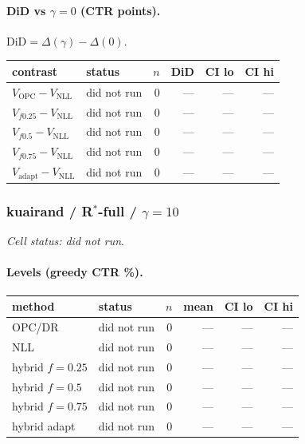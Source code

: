 \documentclass[10pt,a4paper]{article}
\begin{document}
\paragraph{DiD vs $\gamma=0$ (CTR points).} $\mathrm{DiD}=\Delta(\gamma)-\Delta(0)$.
{\centering\small\begin{tabular}{llrrrr}
\toprule contrast & status & $n$ & DiD & CI lo & CI hi \\
\midrule
$V_{\mathrm{OPC}}-V_{\mathrm{NLL}}$ & did not run & 0 & --- & --- & --- \\
$V_{f0.25}-V_{\mathrm{NLL}}$ & did not run & 0 & --- & --- & --- \\
$V_{f0.5}-V_{\mathrm{NLL}}$ & did not run & 0 & --- & --- & --- \\
$V_{f0.75}-V_{\mathrm{NLL}}$ & did not run & 0 & --- & --- & --- \\
$V_{\mathrm{adapt}}-V_{\mathrm{NLL}}$ & did not run & 0 & --- & --- & --- \\
\bottomrule\end{tabular}\par}
\bigskip
\subsubsection{kuairand / R$^*$-full / $\gamma=10$}
\emph{Cell status: did not run}.
\paragraph{Levels (greedy CTR \%).}
{\centering\small\begin{tabular}{llrrrr}
\toprule method & status & $n$ & mean & CI lo & CI hi \\
\midrule
OPC/DR & did not run & 0 & --- & --- & --- \\
NLL & did not run & 0 & --- & --- & --- \\
hybrid $f{=}0.25$ & did not run & 0 & --- & --- & --- \\
hybrid $f{=}0.5$ & did not run & 0 & --- & --- & --- \\
hybrid $f{=}0.75$ & did not run & 0 & --- & --- & --- \\
hybrid adapt & did not run & 0 & --- & --- & --- \\
\bottomrule\end{tabular}\par}
\end{document}
